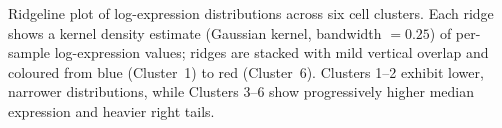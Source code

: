 \caption{Ridgeline plot of log-expression distributions across six cell clusters. Each ridge shows a kernel density estimate (Gaussian kernel, bandwidth $= 0.25$) of per-sample log-expression values; ridges are stacked with mild vertical overlap and coloured from blue (Cluster~1) to red (Cluster~6). Clusters 1--2 exhibit lower, narrower distributions, while Clusters 3--6 show progressively higher median expression and heavier right tails.}

